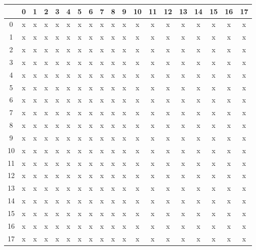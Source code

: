 \documentclass[german,version-2020-11]{uzl-thesis}
\begin{document}
\begin{center}
\begin{tabular}{c c c c c c c c c c c c c c c c c c c}
\hline
& 0 & 1 & 2 & 3 & 4 & 5 & 6 & 7 & 8 & 9 & 10 & 11 & 12 & 13 & 14 & 15 & 16 & 17  \\ 
\hline
0& x & x & x & x & x & x & x & x & x & x & x & x & x & x & x & x & x & x  \\ 
\hline
1 &x & x & x &  x & x & x & x & x & x & x & x & x & x & x & x & x & x & x \\ 
\hline
2& x & x & x & x & x & x & x & x & x & x & x & x & x & x & x & x & x & x  \\ 
\hline
3&x & x & x & x & x & x & x & x & x & x & x & x & x & x & x & x & x & x  \\ 
\hline
4&x  & x & x & x & x & x & x & x & x & x & x & x & x & x & x & x & x & x  \\ 
\hline
5 &x  & x & x & x & x & x & x & x & x & x & x & x & x & x & x & x & x & x  \\ 
\hline
6 &x  & x & x & x & x & x & x & x & x & x & x & x & x & x & x & x & x & x \\ 
\hline
7 & x  &  x & x & x & x & x & x & x & x & x & x & x & x & x & x & x & x & x  \\ 
\hline
8 & x  & x & x & x & x & x & x & x & x & x & x & x & x & x & x & x & x & x  \\ 
\hline
9 & x  & x & x & x & x & x & x & x & x & x & x & x & x & x & x & x & x & x  \\ 
\hline
10 & x  & x & x & x & x & x & x & x & x & x & x & x & x & x & x & x & x & x  \\ 
\hline
11 & x  & x & x & x & x & x & x & x & x & x & x & x & x & x & x & x & x & x  \\ 
\hline
12 & x  & x & x & x & x &x &  x & x & x & x & x & x & x & x & x & x & x & x  \\ 
\hline
13 & x  & x & x & x & x & x &x &  x & x & x & x & x & x & x & x & x & x & x  \\ 
\hline
14 & x  & x & x & x & x & x & x &x &  x & x & x & x & x & x & x & x & x & x  \\ 
\hline
15 & x  & x & x & x & x & x & x & x &x &  x & x & x & x & x & x & x & x & x  \\ 
\hline
16 & x  & x & x & x & x & x & x & x & x &x &  x & x & x & x & x & x & x & x  \\ 
\hline
17 & x  & x & x & x & x & x & x & x & x & x &x &  x & x & x & x & x & x & x \\ 
\hline
\end{tabular}\end{center}\\
\end{document}
